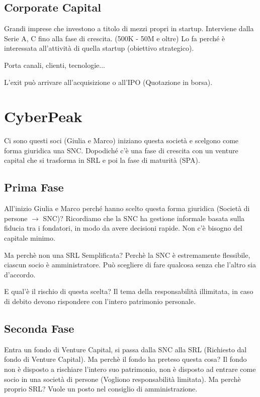 \documentclass[a4paper,12pt]{article}
\begin{document}
	\subsection{Corporate Capital}
	Grandi imprese che investono a titolo di mezzi propri in startup. Interviene dalla Serie A, C fino alla fase di crescita. (500K - 50M e oltre) Lo fa perché è interessata all'attività di quella startup (obiettivo strategico).
	
	Porta canali, clienti, tecnologie...
	
	L'exit può arrivare all'acquisizione o all'IPO (Quotazione in borsa).
	
	\section{CyberPeak}
	Ci sono questi soci (Giulia e Marco) iniziano questa società e scelgono come forma giuridica una SNC. Dopodiché c'è una fase di crescita con un venture capital che si trasforma in SRL e poi la fase di maturità (SPA). %
	
	\subsection{Prima Fase}
	All'inizio Giulia e Marco perché hanno scelto questa forma giuridica (Società di persone $ \rightarrow $ SNC)?
	Ricordiamo che la SNC ha gestione informale basata sulla fiducia tra i fondatori, in modo da avere decisioni rapide. Non c'è bisogno del capitale minimo.
	
	Ma perchè non una SRL Semplificata? Perchè la SNC è estremamente flessibile, ciascun socio è amministratore. Può scegliere di fare qualcosa senza che l'altro sia d'accordo. 
	
	E qual'è il rischio di questa scelta? Il tema della responsabilità illimitata, in caso di debito devono rispondere con l'intero patrimonio personale.
	
	\subsection{Seconda Fase}
	Entra un fondo di Venture Capital, si passa dalla SNC alla SRL (Richiesto dal fondo di Venture Capital). Ma perchè il fondo ha preteso questa cosa? Il fondo non è disposto a rischiare l'intero suo patrimonio, non è disposto ad entrare come socio in una società di persone (Vogliono responsabilità limitata). Ma perchè proprio SRL? Vuole un posto nel consiglio di amministrazione.
	
\end{document}
